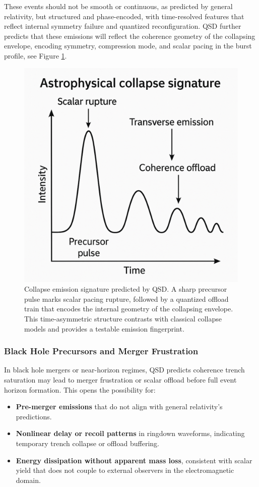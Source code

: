 \documentclass[entropy,article,submit,pdftex,moreauthors]{Definitions/mdpi}
\begin{document}
These events should not be smooth or continuous, as predicted by general relativity, but structured and phase-encoded, with time-resolved features that reflect internal symmetry failure and quantized reconfiguration. QSD further predicts that these emissions will reflect the coherence geometry of the collapsing envelope, encoding symmetry, compression mode, and scalar pacing in the burst profile, see Figure \ref{fig:collapse_signature}.

\begin{figure}[htbp]
  \centering
  \includegraphics[width=0.85\linewidth]{figures/astrocollapse.pdf}
  \caption{Collapse emission signature predicted by QSD. A sharp precursor pulse marks scalar pacing rupture, followed by a quantized offload train that encodes the internal geometry of the collapsing envelope. This time-asymmetric structure contrasts with classical collapse models and provides a testable emission fingerprint.}
  \label{fig:collapse_signature}
\end{figure}

\subsubsection{Black Hole Precursors and Merger Frustration}

In black hole mergers or near-horizon regimes, QSD predicts coherence trench saturation may lead to merger frustration or scalar offload before full event horizon formation. This opens the possibility for:
\begin{itemize}
  \item \textbf{Pre-merger emissions} that do not align with general relativity’s predictions.
  \item \textbf{Nonlinear delay or recoil patterns} in ringdown waveforms, indicating temporary trench collapse or offload buffering.
  \item \textbf{Energy dissipation without apparent mass loss}, consistent with scalar yield that does not couple to external observers in the electromagnetic domain.
\end{itemize}
\end{document}
